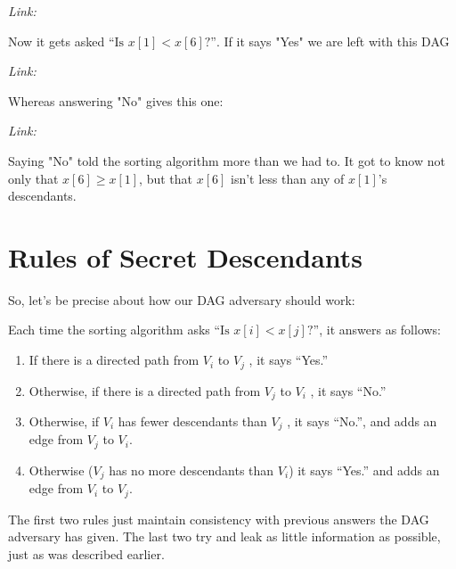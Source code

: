 \documentclass[11pt]{article}
\begin{document}
\textit{Link: }\texttt{}

Now it gets asked $\mbox{``Is } x[1] < x[6]\mbox{?''}$. If it says "Yes" we are left with this DAG
\begin{center}\end{center}

\textit{Link: }\texttt{}

Whereas answering "No" gives this one:
\begin{center}\end{center}

\textit{Link: }\texttt{}

Saying "No" told the sorting algorithm more than we had to. It got to know not only that $x[6] \geq x[1]$, but that $x[6]$ isn't less than any of $x[1]$'s descendants.
\section{Rules of Secret Descendants}

So, let's be precise about how our DAG adversary should work:

Each time the sorting algorithm asks $\mbox{``Is } x[i] < x[j]\mbox{?''}$, it answers as follows:
\begin{enumerate}
\item If there is a directed path from $V_i$ to $V_j$ , it says “Yes.”
\item Otherwise, if there is a directed path from $V_j$ to $V_i$ , it says “No.”
\item Otherwise, if $V_i$ has fewer descendants than $V_j$ , it says “No.”, and adds an edge from $V_j$ to $V_i$.
\item Otherwise ($V_j$ has no more descendants than $V_i$) it says “Yes.” and adds an edge from $V_i$ to $V_j$.
\end{enumerate}

The first two rules just maintain consistency with previous answers the DAG adversary has given. The last two try and leak as little information as possible, just as was described earlier.
\end{document}
